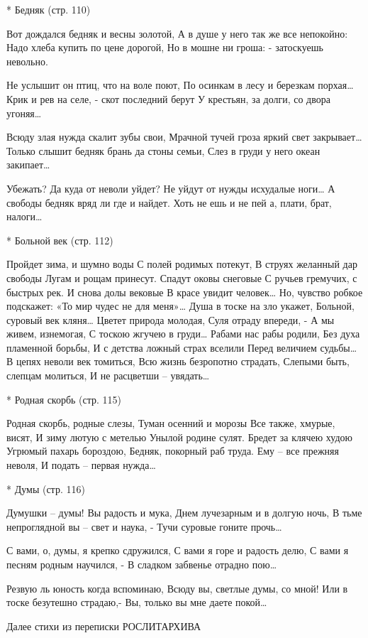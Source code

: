 * Бедняк (стр. 110)

Вот дождался бедняк и весны золотой,
А в душе у него так же все непокойно:
Надо хлеба купить по цене дорогой,
Но в мошне ни гроша: - затоскуешь невольно.

Не услышит он птиц, что на воле поют,
По осинкам в лесу и березкам порхая…
Крик и рев на селе, - скот последний берут
У крестьян, за долги, со двора угоняя…

Всюду злая нужда скалит зубы свои,
Мрачной тучей гроза яркий свет закрывает…
Только слышит бедняк брань да стоны семьи,
Слез в груди у него океан закипает…

Убежать? Да куда от неволи уйдет?
Не уйдут от нужды исхудалые ноги…
А свободы бедняк вряд ли где и найдет.
Хоть не ешь и не пей а, плати, брат, налоги…


* Больной век (стр. 112)

Пройдет зима, и шумно воды
С полей родимых потекут,
В струях желанный дар свободы
Лугам и рощам принесут.
Спадут оковы снеговые
С ручьев гремучих, с быстрых рек.
И снова долы вековые
В красе увидит человек…
Но, чувство робкое подскажет:
 «То мир чудес не для меня»…
Душа в тоске на зло укажет,
Больной, суровый век кляня…
Цветет природа молодая,
Суля отраду впереди, -
А мы живем, изнемогая,
С тоскою жгучею в груди…
Рабами нас рабы родили,
Без духа пламенной борьбы,
И с детства ложный страх вселили
Перед величием судьбы…
В цепях неволи век томиться,
Всю  жизнь безропотно страдать,
Слепыми быть, слепцам молиться,
И не расцветши – увядать…


* Родная скорбь (стр. 115)

Родная скорбь, родные слезы,
Туман осенний и морозы
Все также, хмурые, висят,
И зиму лютую с метелью
Унылой родине сулят.
Бредет за клячею худою
Угрюмый пахарь бороздою,
Бедняк, покорный раб труда.
Ему – все прежняя неволя,
И подать – первая нужда…


* Думы (стр. 116)

Думушки – думы! Вы радость и мука,
Днем лучезарным и в долгую ночь,
В тьме непроглядной вы – свет и наука, -
Тучи суровые гоните прочь…

С вами, о, думы, я крепко сдружился,
С вами я горе и радость делю,
С вами я песням родным научился, -
В сладком забвенье отрадно пою…

Резвую ль юность когда вспоминаю,
Всюду вы, светлые думы, со мной!
Или в тоске безутешно страдаю,-
Вы, только вы мне даете покой…


Далее стихи из переписки РОСЛИТАРХИВА


